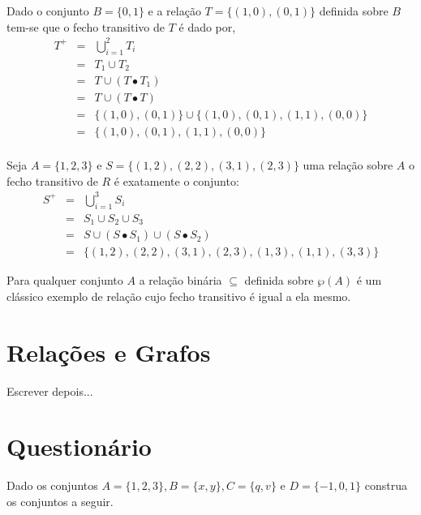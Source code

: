 \begin{example}
	Dado o conjunto $B = \{0,1\}$ e a relação $T = \{(1, 0), (0, 1)\}$ definida sobre $B$ tem-se que o fecho transitivo de $T$ é dado por, 
	\begin{eqnarray*}
		T^+ & = & \bigcup_{i = 1}^2 T_i\\
		& = & T_1 \cup T_2\\
		& = & T \cup (T \bullet T_1)\\
		& = & T \cup (T \bullet T)\\
		& = &  \{(1, 0), (0, 1)\} \cup  \{(1, 0), (0, 1), (1, 1), (0, 0)\}\\
		& = &  \{(1, 0), (0, 1), (1, 1), (0, 0)\}\\
	\end{eqnarray*}
\end{example}

\begin{example}
	Seja $A = \{1, 2, 3\}$ e $S =\{(1, 2), (2, 2), (3, 1), (2, 3)\}$ uma relação sobre $A$ o fecho transitivo de $R$ é exatamente o conjunto:
	\begin{eqnarray*}
		S^+ & = & \bigcup_{i = 1}^3 S_i\\
		 & = & S_1 \cup S_2 \cup S_3\\
		 & = & S \cup (S \bullet S_1) \cup (S \bullet S_2)\\
		 & = & \{(1, 2), (2, 2), (3, 1), (2, 3), (1, 3), (1, 1), (3, 3)\}
	\end{eqnarray*}
\end{example}

\begin{example}
	Para qualquer conjunto $A$ a relação binária $\subseteq$ definida sobre $\wp(A)$ é um clássico exemplo de relação cujo fecho transitivo é igual a ela mesmo.
\end{example}

\section{Relações e Grafos}\label{sec:RelacoesGrafos}

Escrever depois...

\section{Questionário}\label{sec:Questionario3part1}

\begin{problem}\label{prob:Relacoes1}
	Dado os conjuntos $A = \{1, 2, 3\}, B = \{x, y\}, C = \{q, v\}$ e $D = \{-1, 0, 1\}$ construa os conjuntos a seguir.
\end{problem}

